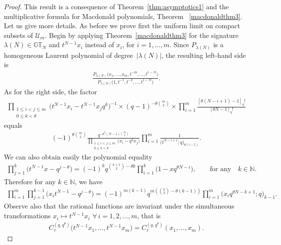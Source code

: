 \documentclass[pdftex]{sigma}
\numberwithin{equation}{section}
\newcommand{\N}{\mathbb{N}}
\newcommand{\U}{\mathcal{U}}
\newcommand{\GT}{\mathbb{GT}}
\begin{document}
\begin{proof}
This result is a consequence of Theorem~\ref{thm:asymptotics1} and the multiplicative formula for Macdonald polynomials, Theorem ~\ref{macdonaldthm3}. Let us give more details. As before we prove f\/irst the uniform limit on compact subsets of $\U_m$.
Begin by applying Theorem~\ref{macdonaldthm3} for the signature $\lambda(N)\in\GT_N$ and $t^{N-1}x_i$ instead of $x_i$, for $i = 1, \dots, m$. Since $P_{\lambda(N)}$ is a homogeneous Laurent polynomial of degree~$|\lambda(N)|$, the resulting left-hand side is
\begin{gather}\label{eq:lhs}
\frac{P_{\lambda(N)}\big(x_1, \dots, x_m, t^{-m}, \dots, t^{1-N}\big)}{P_{\lambda(N)}\big(1, t^{-1}, t^{-2}, \dots, t^{1-N}\big)}.
\end{gather}
As for the right side, the factor
\begin{gather*}
\prod_{\substack{1\leq i<j\leq m \\ 0\leq k<\theta}}{\big(t^{N-1}x_i - t^{N-1}x_jq^k\big)^{-1}} \times (q-1)^{-\theta{m \choose 2}}\times\prod_{i=1}^m{\frac{[\theta(N-i+1)-1]_q!}{[\theta N - 1]_q!}}
\end{gather*} equals
\begin{gather}\label{eq:rhs1}
(-1)^{\theta {m \choose 2}}\frac{q^{-\theta^2(N-1){m \choose 2}}}{\prod_{\substack{1\leq i<j\leq m \\ 0\leq k<\theta}}{\big(x_i - q^kx_j\big)}}\prod_{i=1}^m{\frac{1}{\big(t^{N-i+1}; q\big)_{\theta(i-1)}}}.
\end{gather}
We can also obtain easily the polynomial equality
\begin{gather*}
\prod_{j=1}^k{\big(t^{N-1}x - q^{j-\theta}\big)} = (-1)^kq^{{k+1 \choose 2} - \theta k}\prod_{i=1}^k{\big(1 - xq^{\theta N - i}\big)}, \qquad \text{for any}\quad k\in\N.
\end{gather*} Therefore for any $k\in\N$, we have
\begin{gather}\label{eq:rhs2}
\prod_{i=1}^m\prod_{j=1}^{k - 1}{\big(x_it^{N-1} - q^{j - \theta}\big)} = (-1)^{m(k - 1)}q^{m\left( {k\choose 2} - \theta(k - 1)\right)}\prod_{i=1}^m{\big(x_iq^{\theta N - k+1}; q\big)_{k-1}}.
\end{gather}
Observe also that the rational functions are invariant under the simultaneous transformations $x_i \mapsto t^{N-1}x_i$ $\forall\, i = 1, 2, \dots, m$, that is
\begin{gather}\label{eq:rhs3}
C_{\tau}^{(q, q^{\theta})}\big(t^{N-1}x_1, \dots, t^{N-1}x_m\big) = C_{\tau}^{(q, q^{\theta})}(x_1, \dots, x_m).

\end{gather}
\end{proof}
\end{document}
